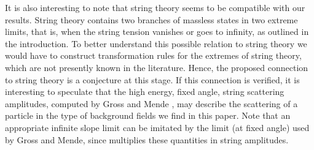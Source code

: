 \documentclass[a4paper,12pt]{article}
\begin{document}
It is also interesting to note that string theory seems to be compatible
with our results. String theory contains two branches of massless states in
two extreme limits, that is, when the string tension vanishes or goes to
infinity, as outlined in the introduction. To better understand this
possible relation to string theory we would have to construct transformation
rules for the extremes of string theory, which are not presently known in
the literature. Hence, the proposed connection to string theory is a
conjecture at this stage. If this connection is verified, it is interesting
to speculate that the high energy, fixed angle, string scattering
amplitudes, computed by Gross and Mende \cite{gross}, may describe the
scattering of a particle in the type of background fields we find in this
paper. Note that an appropriate infinite slope limit \myHighlight{$\alpha ^{\prime
}\rightarrow \infty $}\coordHE{} can be imitated by the limit \coordHE{}
(at fixed angle) used by Gross and Mende, since \myHighlight{$\alpha ^{\prime }$}\coordHE{}
multiplies these quantities in string amplitudes.
\end{document}
